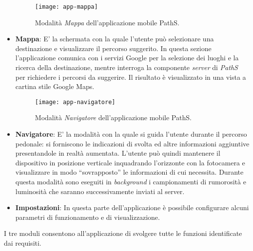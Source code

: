 \begin{itemize}

\begin{figure}[ht]
  \centering
  \texttt{[image: app-mappa]}
  \caption{\footnotesize{Modalità \emph{Mappa} dell'applicazione mobile PathS.}}
  \label{fig:app-mappa}
\end{figure}

\item \textbf{Mappa}: E' la schermata con la quale l'utente può selezionare una destinazione e visualizzare il percorso suggerito. In questa sezione l'applicazione comunica con i servizi Google per la selezione dei luoghi e la ricerca della destinazione, mentre interroga la componente \emph{server} di \emph{PathS} per richiedere i percorsi da suggerire. Il risultato è visualizzato in una vista a cartina stile Google Maps.

\begin{figure}[ht]
  \centering
  \texttt{[image: app-navigatore]}
  \caption{\footnotesize{Modalità \emph{Navigatore} dell'applicazione mobile PathS.}}
  \label{fig:app-navigatore}
\end{figure}

\item \textbf{Navigatore}: E' la modalità con la quale si guida l'utente durante il percorso pedonale: si forniscono le indicazioni di svolta ed altre informazioni aggiuntive presentandole in realtà aumentata. L'utente può quindi mantenere il dispositivo in posizione verticale inquadrando l'orizzonte con la fotocamera e visualizzare in modo ``sovrapposto'' le informazioni di cui necessita. Durante questa modalità sono eseguiti in \emph{background} i campionamenti di rumorosità e luminosità che saranno successivamente inviati al server.
\item \textbf{Impostazioni}: In questa parte dell'applicazione è possibile configurare alcuni parametri di funzionamento e di visualizzazione.
\end{itemize} 

I tre moduli consentono all'applicazione di svolgere tutte le funzioni identificate dai requisiti.

